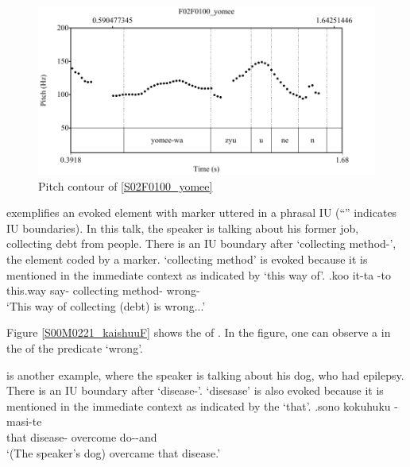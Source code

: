 \begin{figure}
	\begin{center}
	\includegraphics[width=.5\textwidth]{sounds/s02F0100_yomee.pdf}
	\caption{Pitch contour of \ref{S02F0100_yomee}}
	\label{S02F0100_yomeeF}
	\end{center}
\end{figure}

\Next exemplifies an evoked element with  marker
uttered in a phrasal IU
(``\tp{\dvline}'' indicates IU boundaries).
In this talk, the speaker is talking about his former job,
collecting debt from people.
There is an IU boundary after  `collecting method-', the element coded by a  marker.
 `collecting method' is evoked because
it is mentioned in the immediate context
as indicated by  `this way of'.
%
\exg.\label{S00M0221_kaishuu}koo it-ta \tp{\dvline}   \tp{\dvline} -to \tp{\dvline} \\
	this.way say- {} collecting method- {} wrong- {} \\
	`This way of collecting (debt) is wrong...'

Figure \ref{S00M0221_kaishuuF} shows the  of \Last.
In the figure,
one can observe a  in the  of the predicate  `wrong'.

\Next is another example,
where the speaker is talking about his dog,
who had epilepsy.
There is an IU boundary after  `disease-'.
 `disesase' is also evoked because it is mentioned in the immediate context
as indicated by the   `that'.
%
\exg.\label{S02M0198_tenkan}sono  \tp{\dvline} {kokuhuku} -masi-te \tp{\dvline} \\
		that disease- {} overcome do--and {} \\
		`(The speaker's dog) overcame that disease.'

